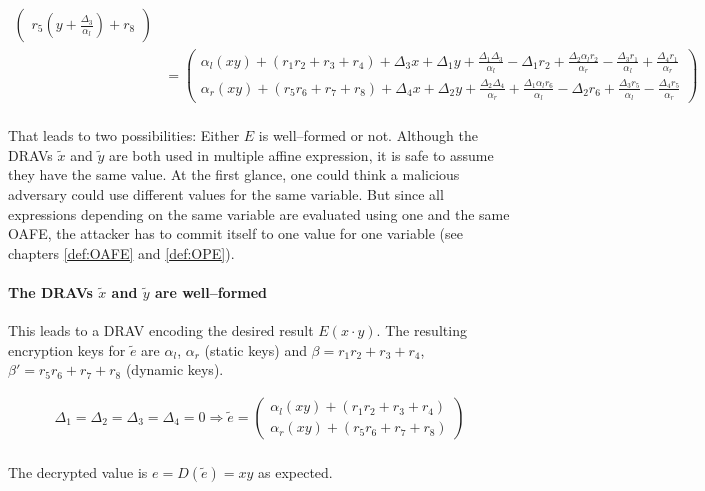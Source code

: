 \begin{align*}
\begin{pmatrix}
    r_5          \left(y + \frac{\Delta_3}{\alpha_l}\right) + r_8
  \end{pmatrix} \\
%
  & =
  \begin{pmatrix}
    \alpha_l(xy) + (r_1r_2 + r_3 + r_4)
    + \Delta_3x + \Delta_1y
    + \frac{\Delta_1\Delta_3}{\alpha_l}
    - \Delta_1r_2
    + \frac{\Delta_2\alpha_lr_2}{\alpha_r}
    - \frac{\Delta_3r_1}{\alpha_l}
    + \frac{\Delta_4r_1}{\alpha_r}
    \\
    \alpha_r(xy) + (r_5r_6 + r_7 + r_8)
    + \Delta_4x + \Delta_2y
    + \frac{\Delta_2\Delta_4}{\alpha_r}
    + \frac{\Delta_1\alpha_lr_6}{\alpha_l}
    - \Delta_2r_6
    + \frac{\Delta_3r_5}{\alpha_l}
    - \frac{\Delta_4r_5}{\alpha_r}
  \end{pmatrix} \\
%
\end{align*}

\noindent{}That leads to two possibilities: Either $E$ is well--formed or not.
Although the DRAVs $\widetilde{x}$ and $\widetilde{y}$ are both used in multiple
affine expression, it is safe to assume they have the same value. At the first
glance, one could think a malicious adversary could use different values for the
same variable. But since all expressions depending on the same variable are
evaluated using one and the same OAFE, the attacker has to commit itself to one
value for one variable (see chapters \ref{def:OAFE} and \ref{def:OPE}).

\paragraph{The DRAVs $\widetilde{x}$ and $\widetilde{y}$ are well--formed}

This leads to a DRAV encoding the desired result $E(x \cdot y)$. The resulting
encryption keys for $\widetilde{e}$ are $\alpha_l$, $\alpha_r$ (static keys) and
$\beta = r_1r_2 + r_3 + r_4$, $\beta' = r_5r_6 + r_7 + r_8$ (dynamic keys).

\begin{align*}
  \Delta_1=\Delta_2=\Delta_3=\Delta_4=0 \Rightarrow
  \widetilde{e} =
  \begin{pmatrix}
    \alpha_l(xy) + (r_1r_2 + r_3 + r_4) \\
    \alpha_r(xy) + (r_5r_6 + r_7 + r_8)
  \end{pmatrix} \\
\end{align*}

\noindent{}The decrypted value is $e = D(\widetilde{e}) = xy$ as expected.


